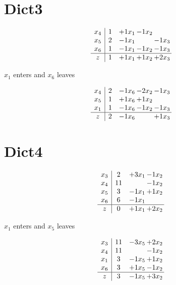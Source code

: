 \documentclass[12pt]{article}
\begin{document}
\section{Dict3}
\[\begin{array}{c| c c@{\hskip 2pt} c@{\hskip 2pt} c@{\hskip 2pt} }
 x_4   &  1 & + 1 x_1 & -1 x_2 &   \\
 x_5   &  2 & -1 x_1 &   & -1 x_3\\
 x_6   &  1 & -1 x_1 & -1 x_2 & -1 x_3\\
\hline
z    &  1 & + 1 x_1 & + 1 x_2 & + 2 x_3\\
\end{array}\]


 $ x_1 $ enters and $ x_6 $ leaves 

 \[\begin{array}{c| c c@{\hskip 2pt} c@{\hskip 2pt} c@{\hskip 2pt} }
 x_4   &  2 & -1 x_6 & -2 x_2 & -1 x_3\\
 x_5   &  1 & + 1 x_6 & + 1 x_2 &   \\
 x_1   &  1 & -1 x_6 & -1 x_2 & -1 x_3\\
\hline
z    &  2 & -1 x_6 &   & + 1 x_3\\
\end{array}\]

\section{Dict4}

\[\begin{array}{c| c c@{\hskip 2pt} c@{\hskip 2pt} }
 x_3   &  2 & + 3 x_1 & -1 x_2\\
 x_4   &  11  &   & -1 x_2\\
 x_5   &  3 & -1 x_1 & + 1 x_2\\
 x_6   &  6 & -1 x_1 &   \\
\hline
z    &  0 & + 1 x_1 & + 2 x_2\\
\end{array}\]


 $ x_1 $ enters and $ x_5 $ leaves 

 \[\begin{array}{c| c c@{\hskip 2pt} c@{\hskip 2pt} }
 x_3   &  11 & -3 x_5 & + 2 x_2\\
 x_4   &  11  &   & -1 x_2\\
 x_1   &  3 & -1 x_5 & + 1 x_2\\
 x_6   &  3 & + 1 x_5 & -1 x_2\\
\hline
z    &  3 & -1 x_5 & + 3 x_2\\
\end{array}\]
\end{document}
